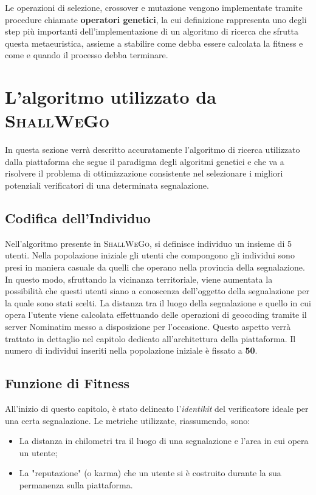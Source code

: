     Le operazioni di selezione, crossover e mutazione vengono implementate tramite procedure chiamate \textbf{operatori genetici}, la cui definizione rappresenta uno degli step più importanti dell'implementazione di un algoritmo di ricerca che sfrutta questa metaeuristica, assieme a stabilire come debba essere calcolata la fitness e come e quando il processo debba terminare. 

    \newpage

\section{L'algoritmo utilizzato da \textsc{ShallWeGo}}
    In questa sezione verrà descritto accuratamente l'algoritmo di ricerca utilizzato dalla piattaforma che segue il paradigma degli algoritmi genetici e che va a risolvere il problema di ottimizzazione consistente nel selezionare i migliori potenziali verificatori di una determinata segnalazione.

\subsection{Codifica dell'Individuo}
    Nell'algoritmo presente in \textsc{ShallWeGo}, si definisce individuo un insieme di 5 utenti. Nella popolazione iniziale gli utenti che compongono gli individui sono presi in maniera casuale da quelli che operano nella provincia della segnalazione. In questo modo, sfruttando la vicinanza territoriale, viene aumentata la possibilità che questi utenti siano a conoscenza dell'oggetto della segnalazione per la quale sono stati scelti. La distanza tra il luogo della segnalazione e quello in cui opera l'utente viene calcolata effettuando delle operazioni di geocoding tramite il server Nominatim messo a disposizione per l'occasione. Questo aspetto verrà trattato in dettaglio nel capitolo dedicato all'architettura della piattaforma. Il numero di individui inseriti nella popolazione iniziale è fissato a \textbf{50}.

\subsection{Funzione di Fitness}
    All'inizio di questo capitolo, è stato delineato l'\textit{identikit} del verificatore ideale per una certa segnalazione. Le metriche utilizzate, riassumendo, sono:

    \begin{itemize}
        \item La distanza in chilometri tra il luogo di una segnalazione e l'area in cui opera un utente;
        \item La "reputazione" (o karma) che un utente si è costruito durante la sua permanenza sulla piattaforma.
    \end{itemize}

